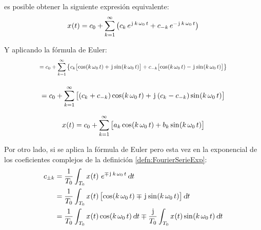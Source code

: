 es posible obtener la siguiente expresión equivalente:
\begin{equation}
    \fx[x]{t} = c_0 + \sum_{\kth=1}^{\infty} \inParentheses{ c_\kth \, e^{\iu \, \kth \, \omega_0 \, t} + c_{-\kth} \, e^{-\iu \, \kth \, \omega_0 \, t} }
    \label{eqn:FourierExpBis}
\end{equation}

Y aplicando la fórmula de Euler:
\begin{align*}
    &
    \scale{0.80}{
    = c_0 + \sum_{\kth=1}^{\infty} \inBraces{c_\kth \inBrackets{\fx[\cos]{\kth \, \omega_0 \, t} + \iu \fx[\sin]{\kth \, \omega_0 \, t}} + c_{-\kth} \inBrackets{\fx[\cos]{\kth \, \omega_0 \, t} - \iu \fx[\sin]{\kth \, \omega_0 \, t}} }
    }
    \\[1em]
    &= c_0 + \sum_{\kth=1}^{\infty} \inBrackets{ \inParentheses{c_\kth + c_{-\kth}} \fx[\cos]{\kth \, \omega_0 \, t} + \iu \inParentheses{c_\kth - c_{-\kth}} \fx[\sin]{\kth \, \omega_0 \, t} }
\end{align*}

\begin{mdframed}[style=DefinitionFrame]
    \begin{defn}
        \label{defn:FourierSerieTrig}
    \end{defn}
    \begin{equation*}
        \fx[x]{t} = c_0 + \sum_{\kth=1}^{\infty} \inBrackets{a_\kth \fx[\cos]{\kth \, \omega_0 \, t} + b_\kth \fx[\sin]{\kth \, \omega_0 \, t} }
    \end{equation*}
\end{mdframed}

Por otro lado, si se aplica la fórmula de Euler pero esta vez en la exponencial de los coeficientes complejos de la definición \ref{defn:FourierSerieExp}:
\begin{align*}
    c_{\pm\kth} &= \frac{1}{T_0} \int_{T_0} \fx[x]{t} \, e^{\mp \iu \, \kth \, \omega_0 \, t} \, \dif t
    \\
    &= \frac{1}{T_0} \int_{T_0} \fx[x]{t} \inBrackets{ \fx[\cos]{\kth \, \omega_0 \, t} \mp \iu \fx[\sin]{\kth \, \omega_0 \, t} } \, \dif t
    \\
    &= \frac{1}{T_0} \int_{T_0} \fx[x]{t} \fx[\cos]{\kth \, \omega_0 \, t} \dif t
    \mp \frac{\iu}{T_0} \int_{T_0} \fx[x]{t} \fx[\sin]{\kth \, \omega_0 \, t} \dif t
\end{align*}

